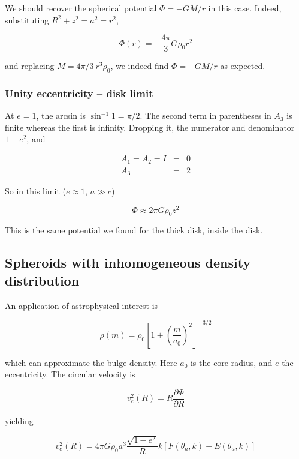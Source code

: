 We should recover the spherical potential $\varPhi=-GM/r$ in this case. Indeed, substituting $R^2+z^2=a^2=r^2$, 


\begin{equation}
\varPhi(r) = -\frac{4\pi}{3} G \rho_0 r^2  
\end{equation}

and replacing $M = 4\pi/3 \  r^3\rho_0 $, we indeed find $\varPhi=-GM/r$ as expected. 

\subsubsection{Unity eccentricity -- disk limit}

At $e=1$, the arcsin is $\sin^{-1} 1 = \pi/2$. The second term in parentheses in $A_3$ is finite whereas the first is infinity. Dropping it, the numerator and denominator $1-e^2$, and 

\begin{eqnarray}
A_1=A_2 = I &=& 0 \\
A_3&=&2
\end{eqnarray}

So in this limit ($e\approx 1$, $a\gg c$) 

\begin{equation}
\varPhi \approx 2\pi G \rho_0 z^2 
\end{equation}

This is the same potential we found for the thick disk, inside the disk.

\subsection{Spheroids with inhomogeneous density distribution}

An application of astrophysical interest is 

\begin{equation}
\rho(m) = \rho_0 \left[ 1 + \left(\frac{m}{a_0}\right)^2\right]^{-3/2}  
\end{equation}

which can approximate the bulge density. Here $a_0$ is the core radius, and $e$ the eccentricity. The circular velocity is 

\begin{equation}
v^2_c (R)  = R\frac{\partial\varPhi}{\partial R} 
\end{equation}

yielding

\begin{equation}
v^2_c (R)  = 4\pi G\rho_0 a^3 \frac{\sqrt{1-e^2}}{R} k \left[F(\theta_a,k) - E(\theta_a,k) \right]
\end{equation}

